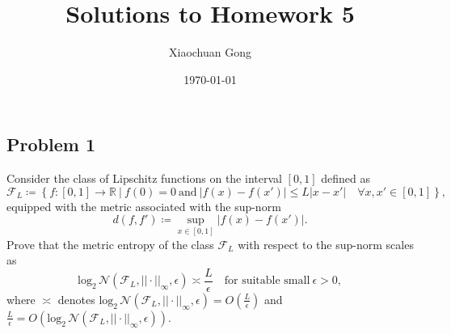 \documentclass[11pt]{article}
\title{Solutions to Homework 5}
\author{Xiaochuan Gong}
\date\today
\begin{document}
\maketitle

\subsection*{Problem 1}
Consider the class of Lipschitz functions on the interval $[0,1]$ defined as 
\[
\mathcal{F}_L \coloneqq \left\{f : [0,1] \rightarrow \mathbb{R}\ |\ f(0)=0\ \text{and}\ |f(x)-f(x')|\leq L|x-x'| \quad \forall x,x'\in [0,1]\right\},
\]
equipped with the metric associated with the sup-norm
\[
d(f,f') \coloneqq \sup\limits_{x\in[0,1]}|f(x)-f(x')|.
\]
Prove that the metric entropy of the class $\mathcal{F}_L$ with respect to the sup-norm scales as
\[
\text{log}_2\,\mathcal{N}(\mathcal{F}_L,||\cdot||_{\infty},\epsilon) \asymp \frac{L}{\epsilon} \quad \text{for suitable small}\ \epsilon>0,
\]
where $\asymp$ denotes $\text{log}_2\,\mathcal{N}(\mathcal{F}_L,||\cdot||_{\infty},\epsilon)=O(\frac{L}{\epsilon})$ and $\frac{L}{\epsilon}=O(\text{log}_2\,\mathcal{N}(\mathcal{F}_L,||\cdot||_{\infty},\epsilon))$.
\end{document}

